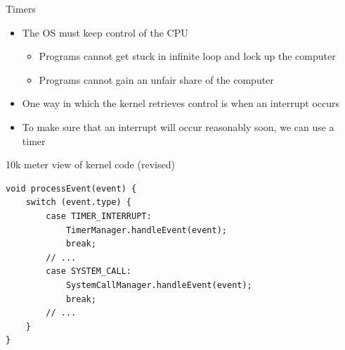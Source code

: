 \begin{frame}[fragile]{Timers}
	\begin{itemize}
		\item The OS must keep control of the CPU
		      \begin{itemize}
			      \item Programs cannot get stuck in infinite loop and lock up the computer
			      \item Programs cannot gain an unfair share of the computer
		      \end{itemize}
		\item One way in which the kernel retrieves
		      control is when an interrupt occurs
		\item To make sure that an interrupt will occur reasonably soon, we can use a timer
	\end{itemize}
\end{frame}

\begin{frame}[fragile]{10k meter view of kernel code (revised)}
	\begin{verbatim}
void processEvent(event) {
    switch (event.type) {
        case TIMER_INTERRUPT:
            TimerManager.handleEvent(event);
            break;
        // ...
        case SYSTEM_CALL:
            SystemCallManager.handleEvent(event);
            break;
        // ...
    }
}
    \end{verbatim}
\end{frame}
